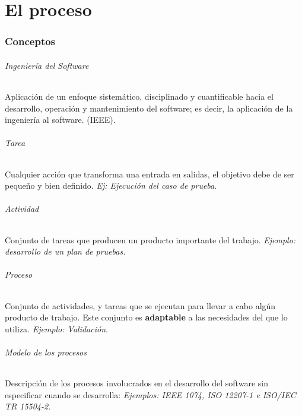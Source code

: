 \part{El proceso}

\section{Conceptos}
\paragraph{Ingeniería del Software} Aplicación de un enfoque sistemático, disciplinado y cuantificable hacia el desarrollo, operación y mantenimiento del software; es decir, la aplicación de la ingeniería al software. (IEEE). %



\paragraph{Tarea} Cualquier acción que transforma una entrada en salidas, el objetivo debe de ser pequeño y bien definido. \textit{Ej: Ejecución del caso de prueba}.


\paragraph{Actividad} Conjunto de tareas que producen un producto importante del trabajo. \textit{Ejemplo: desarrollo de un plan de pruebas.}

\paragraph{Proceso} Conjunto de actividades, y tareas que se ejecutan para llevar a cabo algún producto de trabajo. Este conjunto es \textbf{adaptable} a las necesidades del que lo utiliza. \textit{Ejemplo: Validación}.


\paragraph{Modelo de los procesos} Descripción de los procesos involucrados en el desarrollo del software sin especificar cuando se desarrolla: \textit{Ejemplos: IEEE 1074, ISO 12207-1 e ISO/IEC TR 15504-2}.


